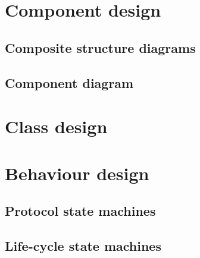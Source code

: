 \section{Component design}


\subsection{Composite structure diagrams}


\subsection{Component diagram}





\section{Class design}



\section{Behaviour design}
\subsection{Protocol state machines}


\subsection{Life-cycle state machines}

